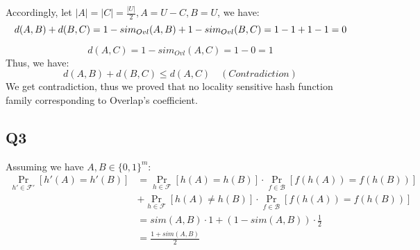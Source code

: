 \documentclass[a4paper, 12pt, titlepage]{article}
\begin{document}
Accordingly, let $|A| =  |C| = \frac{|U|}{2}, A = U - C, B = U$, we have:
\[
    d(A, B) + d(B, C) = 1 - sim_{Ovl}(A, B) + 1 - sim_{Ovl}(B, C) \\
                      = 1 - 1 + 1 - 1
                      = 0
\]     

\[
    d(A, C) = 1 - sim_{Ovl}(A, C) = 1 - 0 = 1
\]
Thus, we have:
\[
    d(A, B) + d(B, C) \leq d(A, C) \quad (Contradiction)
\]
We get contradiction, thus we proved that no locality sensitive hash function family corresponding to Overlap's coefficient.
\subsection{Q3}
Assuming we have $A, B \in \{0, 1\}^m$:
\begin{equation}
    \begin{aligned}
        \Pr_{h' \in \mathcal F'} \left[ h'(A) = h'(B) \right] &= \Pr_{h \in \mathcal F} \left[ h(A) = h(B) \right] \cdot \Pr_{f \in \mathcal B} \left[ f(h(A)) = f(h(B))\right] \\
                                                              &+ \Pr_{h \in \mathcal F} \left[ h(A) \neq h(B) \right] \cdot \Pr_{f \in \mathcal B} \left[ f(h(A)) = f(h(B))\right] \\
                                                              &= sim(A, B) \cdot 1 + (1 - sim(A, B)) \cdot \frac{1}{2} \\
                                                              &= \frac{1 + sim(A, B)}{2}
    \end{aligned}
\end{equation}
\end{document}
